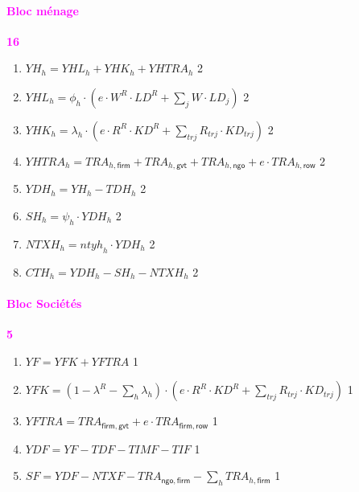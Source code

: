 \documentclass[11pt,a4paper]{article}
\newcommand{\trj}{\mathit{trj}}
\newcommand{\ntyh}{\mathit{ntyh}}
\newcommand{\gvt}{\mathsf{gvt}}
\newcommand{\firm}{\mathsf{firm}}
\newcommand{\ngo}{\mathsf{ngo}}
\newcommand{\row}{\mathsf{row}}
\newcommand{\YDF}{\mathit{YDF}}
\newcommand{\YFTR}{\mathit{YFTRA}}
\newcommand{\CTH}{\mathit{CTH}}
\newcommand{\KD}{\mathit{KD}}
\newcommand{\LD}{\mathit{LD}}
\newcommand{\SF}{\mathit{SF}}
\newcommand{\SH}{\mathit{SH}}
\newcommand{\TIF}{\mathit{TIF}}
\newcommand{\TIMF}{\mathit{TIMF}}
\newcommand{\TRA}{\mathit{TRA}}
\newcommand{\NTXF}{\mathit{NTXF}}
\newcommand{\NTXH}{\mathit{NTXH}}
\newcommand{\TDH}{\mathit{TDH}}
\newcommand{\TDF}{\mathit{TDF}}
\newcommand{\YDH}{\mathit{YDH}}
\newcommand{\YH}{\mathit{YH}}
\newcommand{\YHK}{\mathit{YHK}}
\newcommand{\YHL}{\mathit{YHL}}
\newcommand{\YHTR}{\mathit{YHTRA}}
\newcommand{\YF}{\mathit{YF}}
\newcommand{\YFK}{\mathit{YFK}}
\newcommand{\redparagraph}[1]{\paragraph*{\large\textcolor{Fuchsia}{#1}}}
\begin{document}
	
	
	\redparagraph{Bloc ménage}\hfill \textcolor{Fuchsia}{\textbf{16}}
	\begin{enumerate}[itemsep=2pt,label=\textbf{eq\arabic*}.,resume,ref=\textbf{eq\arabic*}]
		
		\item $\YH_h  =  \YHL_h + \YHK_h + \YHTR_h $ \hfill 2
		
		\item $\YHL_h = \phi_h \cdot\left(e\cdot W^R\cdot\LD^R + \sum_{j}^{}W\cdot \LD_j\right)$ \hfill 2
		
		\item $\YHK_h = \lambda_h\cdot\left(e\cdot R^R\cdot\KD^R + \sum_{\trj}^{} R_{\trj}\cdot\KD_{\trj}\right) $ \hfill 2
		
		\item $\YHTR_h = \TRA_{h,\firm} + \TRA_{h,\gvt} + \TRA_{h,\ngo} + e\cdot\TRA_{h,\row}$ \hfill 2
		
		\item $\YDH_h = \YH_h - \TDH_h$ \hfill 2
		
		\item $\SH_h = \psi_h\cdot\YDH_h$ \hfill 2
		
		\item $\NTXH_{h} = \ntyh_{h} \cdot\YDH_h$ \label{it:TRAGVTh} \hfill 2
		
		\item $\CTH_h = \YDH_h - \SH_h - \NTXH_{h}$  \hfill 2
		
	\end{enumerate}
	
	
	\redparagraph{Bloc Sociétés}\hfill \textcolor{Fuchsia}{\textbf{5}}
	\begin{enumerate}[itemsep=2pt,label=\textbf{eq\arabic*}.,resume, ref=\textbf{eq\arabic*}]
		
		\item $\YF = \YFK + \YFTR$ \hfill 1
		
		\item $\YFK = \left(1 - \lambda^R-\sum_{h}\lambda_h\right)\cdot\left(e\cdot R^R\cdot\KD^R + \sum_{\trj}^{} R_{\trj}\cdot\KD_{\trj}\right)$ \hfill 1
		
		\item $\YFTR = \TRA_{\firm,\gvt}  + e\cdot\TRA_{\firm,\row} $ \hfill 1
		
		\item $\YDF = \YF  - \TDF - \TIMF -\TIF  $ \hfill 1
		
		\item $\SF = \YDF -  \NTXF  - \TRA_{\ngo,\firm} - \sum_{h}\TRA_{h,\firm}$ \hfill 1
		
	\end{enumerate}
	
\end{document}

